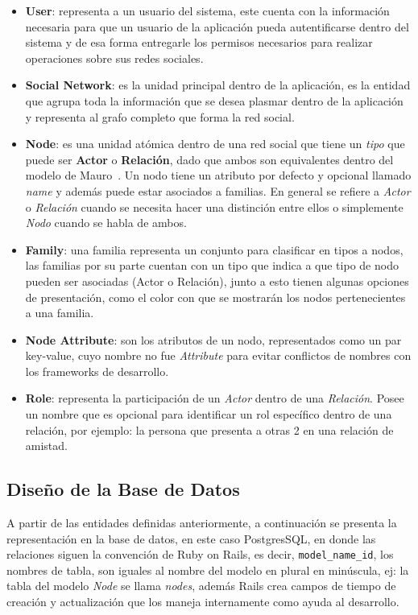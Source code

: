   \begin{itemize}
    \item \textbf{User}: representa a un usuario del sistema, este cuenta con la información necesaria para que un usuario de la aplicación pueda autentificarse dentro del sistema y de esa forma entregarle los permisos necesarios para realizar operaciones sobre sus redes sociales.
    \item \textbf{Social Network}: es la unidad principal dentro de la aplicación, es la entidad que agrupa toda la información que se desea plasmar dentro de la aplicación y representa al grafo completo que forma la red social.
    \item \textbf{Node}: es una unidad atómica dentro de una red social que tiene un \emph{tipo} que puede ser \textbf{Actor} o \textbf{Relación}, dado que ambos son equivalentes dentro del modelo de Mauro~\cite{tesismauro}. Un nodo tiene un atributo por defecto y opcional llamado \emph{name} y además puede estar asociados a familias. En general se refiere a \emph{Actor} o \emph{Relación} cuando se necesita hacer una distinción entre ellos o simplemente \emph{Nodo} cuando se habla de ambos.
    \item \textbf{Family}: una familia representa un conjunto para clasificar en tipos a nodos, las familias por su parte cuentan con un tipo que indica a que tipo de nodo pueden ser asociadas (Actor o Relación), junto a esto tienen algunas opciones de presentación, como el color con que se mostrarán los nodos pertenecientes a una familia.
    \item \textbf{Node Attribute}: son los atributos de un nodo, representados como un par key-value, cuyo nombre no fue \emph{Attribute} para evitar conflictos de nombres con los frameworks de desarrollo.
    \item \textbf{Role}: representa la participación de un \emph{Actor} dentro de una \emph{Relación}. Posee un nombre que es opcional para identificar un rol específico dentro de una relación, por ejemplo: la persona que presenta a otras 2 en una relación de amistad.
  \end{itemize}


\subsection{Diseño de la Base de Datos} %
\label{sub:diseno_de_la_base_de_datos}

A partir de las entidades definidas anteriormente, a continuación se presenta la representación en la base de datos, en este caso PostgresSQL, en donde las relaciones siguen la convención de Ruby on Rails, es decir, \texttt{model\_name\_id}, los nombres de tabla, son iguales al nombre del modelo en plural en minúscula, ej: la tabla del modelo \emph{Node} se llama \emph{nodes}, además Rails crea campos de tiempo de creación y actualización que los maneja internamente como ayuda al desarrollo.

